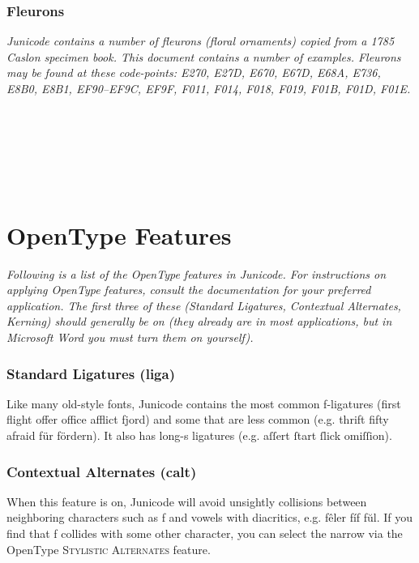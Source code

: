 \documentclass[12pt,a4paper,openany]{book}
\newcommand{\saltb}[1]{{\addfontfeatures{Alternate=1}{#1}}}
\begin{document}
\subsection*{Fleurons}

{\small\itshape Junicode contains a number of fleurons (floral
  ornaments) copied from a 1785 Caslon specimen book. This document
  contains a number of examples. Fleurons may be found at these
  code-points: E270, E27D, E670, E67D, E68A, E736, E8B0, E8B1,
  EF90–EF9C, EF9F, F011, F014, F018, F019, F01B, F01D, F01E.}

\begin{center}
\huge    \\
 \\[0.7ex]
\\[0.7ex]
\\
 
\end{center}

\chapter*{\color{myBlue}OpenType Features}

{\itshape Following is a list of the OpenType features in
  Junicode. For instructions on applying OpenType features, consult
  the documentation for your preferred application. The first three of
  these (Standard Ligatures, Contextual Alternates, Kerning) should
  generally be on (they already are in most applications, but in
  Microsoft Word you must turn them on yourself).}

\subsection*{Standard Ligatures (liga)}

Like many old-style fonts, Junicode contains the most common f-ligatures
(first flight offer office afflict fjord) and some that are less common
(e.g. thrift fifty afraid für fördern).  It
also has long-s ligatures (e.g. aſſert ſtart ſlick omiſſion).

\subsection*{Contextual Alternates (calt)}

When this feature is on, Junicode
will avoid unsightly collisions between neighboring characters such as
f and vowels with diacritics, e.g. fêler fíf fŭl. If you find that f
collides with some other character, you can select the narrow
\saltb{f} via the OpenType {\scshape Stylistic Alternates} feature.
\end{document}
